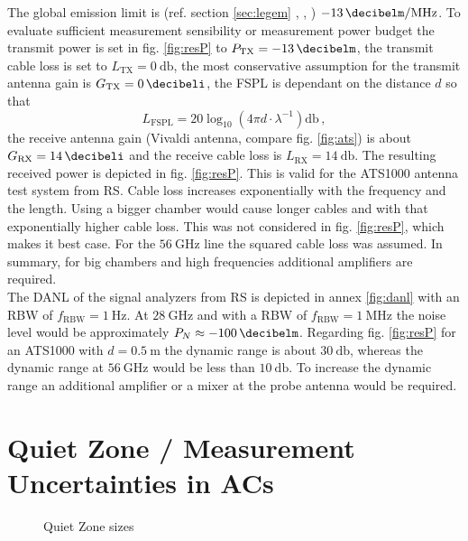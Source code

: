The global emission limit is (ref. section \ref{sec:legem} \cite{ceptercrec}, \cite{ansi}, \cite{fcc}) $\SI{-13}{\decibelm\per\mega\hertz}$. To evaluate sufficient measurement sensibility or measurement power budget the transmit power is set in fig. \ref{fig:resP} to $P_{\text{TX}}=\SI{-13}{\decibelm}$, the transmit cable loss is set to $L_{\text{TX}} = \SI{0}{\decibel}$, the most conservative assumption for the transmit antenna gain is $ G_{\text{TX}} = \SI{0}{\decibeli}$, the \ac{FSPL} is dependant on the distance $d$ so that 
\begin{equation}
L_{\text{FSPL}} = 20\log_{10}\left(4\pi d \cdot\lambda^{-1}\right)\si{\decibel}\,,
\label{eq:fspl}
\end{equation}
the receive antenna gain (Vivaldi antenna, compare fig. \ref{fig:ats}) is about $ G_{\text{RX}} = \SI{14}{\decibeli}$ and the receive cable loss is $L_{\text{RX}}=\SI{14}{\decibel}$. The resulting received power is depicted in fig. \ref{fig:resP}. This is valid for the ATS1000 antenna test system from \ac{RS}. Cable loss increases exponentially with the frequency and the length. Using a bigger chamber would cause longer cables and with that exponentially higher cable loss. This was not considered in fig. \ref{fig:resP}, which makes it best case. For the $\SI{56}{\giga\hertz}$ line the squared cable loss was assumed. In summary, for big chambers and high frequencies additional amplifiers are required.\\
The \ac{DANL} of the signal analyzers from \ac{RS} is depicted in annex \ref{fig:danl} with an \ac{RBW} of $f_{\text{RBW}}=\SI{1}{\hertz}$. At $\SI{28}{\giga\hertz}$ and with a \ac{RBW} of $f_{\text{RBW}}=\SI{1}{\mega\hertz}$ the noise level would be approximately $P_N \approx \SI{-100}{\decibelm}$. Regarding fig. \ref{fig:resP} for an ATS1000 with $d=\SI{0.5}{\meter}$ the dynamic range is about $\SI{30}{\decibel}$, whereas the dynamic range at $\SI{56}{\giga\hertz}$ would be less than $\SI{10}{\decibel}$. To increase the dynamic range an additional amplifier or a mixer at the probe antenna would be required.

\section{Quiet Zone / Measurement Uncertainties in ACs}

\begin{figure}[h]
  \centering
  \centering
\caption{Quiet Zone sizes}
\label{fig:qz}
\end{figure}

